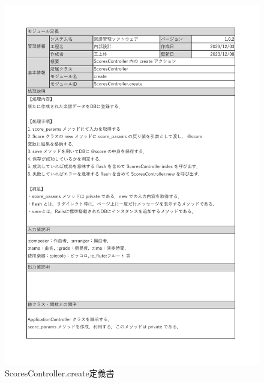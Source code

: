 \begin{figure}[h]
    \centering
    \includegraphics[scale=0.7]{img/Scores/xlsx/ScoresController_create.pdf}
    \vspace{-1cm}
    \caption{ScoresController.create定義書}
\end{figure}
